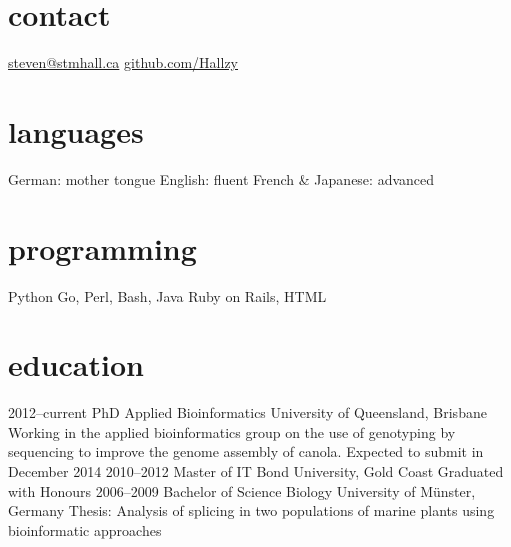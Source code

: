 \documentclass[]{friggeri-cv} %
\begin{document}


\begin{aside} %
\section{contact}
\href{mailto:steven@stmhall.ca}{steven@stmhall.ca}
\href{http://github.com/Hallzy}{github.com/Hallzy}
\section{languages}
German: mother tongue
English: fluent
French \& Japanese: advanced
\section{programming}
Python
Go, Perl, Bash, Java
Ruby on Rails, HTML
\end{aside}


\section{education}

\begin{entrylist}
\entry
{2012--current}
{PhD {\normalfont Applied Bioinformatics}}
{University of Queensland, Brisbane}
{Working in the applied bioinformatics group on the use of genotyping by sequencing to improve the genome assembly of canola. Expected to submit in December 2014}
\entry
{2010--2012}
{Master {\normalfont of IT}}
{Bond University, Gold Coast}
{Graduated with Honours}
\entry
{2006--2009}
{Bachelor of Science {\normalfont Biology}}
{University of Münster, Germany}
{Thesis: Analysis of splicing in two populations of marine plants
using bioinformatic approaches}
\end{entrylist}
\end{document}
